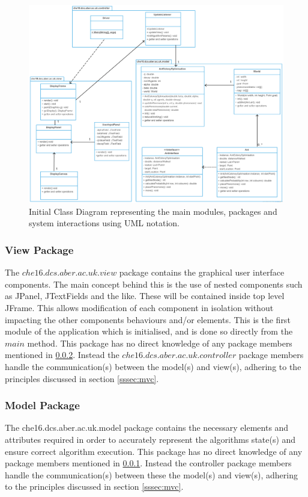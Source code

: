 \clearpage
\begin{figure}
\includegraphics[scale=0.225]{Images/design/diss-uml}
\caption[Class Diagram]{Initial Class Diagram representing the main modules, packages and system interactions using UML notation.}
\label{fig:classdiagram}
\end{figure}
\clearpage

\subsubsection{View Package}

\label{sssec:view}
The $che16.dcs.aber.ac.uk.view$ package contains the graphical user interface components. The main concept behind this is the use of nested components such as JPanel, JTextFields and the like. These will be contained inside top level JFrame. This allows modification of each component in isolation without impacting the other components behaviours and/or elements. This is the first module of the application which is initialised, and is done so directly from the $main$ method. This package has no direct knowledge of any package members mentioned in \ref{sssec:model}. Instead the $che16.dcs.aber.ac.uk.controller$ package members handle the communication(s) between the model(s) and view(s), adhering to the principles discussed in section \ref{sssec:mvc}.

\subsubsection{Model Package}
\label{sssec:model}
The che16.dcs.aber.ac.uk.model package contains the necessary elements and attributes required in order to accurately represent the algorithms state(s) and ensure correct algorithm execution. This package has no direct knowledge of any package members mentioned in \ref{sssec:view}. Instead the controller package members handle the communication(s) between these the model(s) and view(s), adhering to the principles discussed in section \ref{sssec:mvc}.

